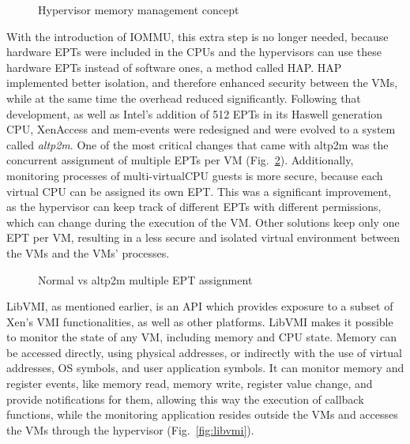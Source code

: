 \begin{figure}
	\centering
	
	\caption{Hypervisor memory management concept}
	\label{fig:hypmm}
\end{figure}

\par With the introduction of \ac{IOMMU}, this extra step is no longer needed, because hardware \acp{EPT} were included in the \ac{CPU}s and the hypervisors can use these hardware \acp{EPT} instead of software ones, a method called \ac{HAP}. \ac{HAP} implemented better isolation, and therefore enhanced security between the \acp{VM}, while at the same time the overhead reduced significantly. Following that development, as well as Intel's addition of 512 \acp{EPT} in its Haswell generation \ac{CPU}, XenAccess and mem-events were redesigned and were evolved to a system called \emph{altp2m}. One of the most critical changes that came with altp2m was the concurrent assignment of multiple \ac{EPT}s per \ac{VM} (Fig.~\ref{fig:ept}). Additionally, monitoring processes of multi-virtual\ac{CPU} guests is more secure, because each virtual \ac{CPU} can be assigned its own \ac{EPT}. This was a significant improvement, as the hypervisor can keep track of different \acp{EPT} with different permissions, which can change during the execution of the \ac{VM}. Other solutions keep only one \ac{EPT} per \ac{VM}, resulting in a less secure and isolated virtual environment between the \acp{VM} and the \acp{VM}' processes.

\begin{figure}[ht]
	\centering
	\scalebox{0.95}{}
	\caption{Normal vs altp2m multiple \ac{EPT} assignment}
	\label{fig:ept}
\end{figure}

\par LibVMI, as mentioned earlier, is an \ac{API} which provides exposure to a subset of Xen’s \ac{VMI} functionalities, as well as other platforms. LibVMI makes it possible to monitor the state of any \ac{VM}, including memory and \ac{CPU} state. Memory can be accessed directly, using physical addresses, or indirectly with the use of virtual addresses, \ac{OS} symbols, and user application symbols. It can monitor memory and register events, like memory read, memory write, register value change, and provide notifications for them, allowing this way the execution of callback functions, while the monitoring application resides outside the \acp{VM} and accesses the \acp{VM} through the hypervisor (Fig.~\ref{fig:libvmi}). 


